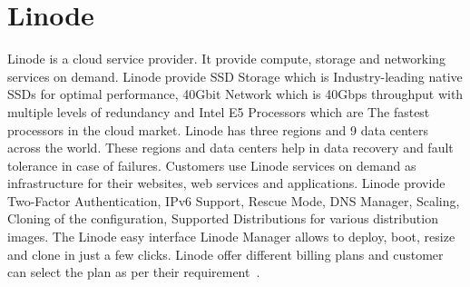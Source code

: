 \section{Linode}

Linode is a cloud service provider. It provide compute, storage and
networking services on demand. Linode provide SSD Storage which is
Industry-leading native SSDs for optimal performance, 40Gbit Network
which is 40Gbps throughput with multiple levels of redundancy and
Intel E5 Processors which are The fastest processors in the cloud
market. Linode has three regions and 9 data centers across the world.
These regions and data centers help in data recovery and fault
tolerance in case of failures. Customers use Linode services on demand
as infrastructure for their websites, web services and applications.
Linode provide Two-Factor Authentication, IPv6 Support, Rescue Mode, DNS Manager, Scaling, Cloning of the
configuration, Supported Distributions for various distribution
images. The Linode easy interface Linode Manager
allows to deploy, boot, resize and clone in just a few clicks. Linode
offer different billing plans and customer can select the plan as per
their requirement~\cite{hid-sp18-511-linode}.

